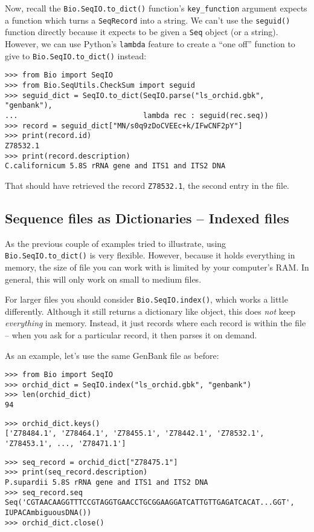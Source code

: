 Now, recall the \verb|Bio.SeqIO.to_dict()| function's \verb|key_function| argument expects a function which turns a \verb|SeqRecord| into a string.  We can't use the \verb|seguid()| function directly because it expects to be given a \verb|Seq| object (or a string).  However, we can use Python's \verb|lambda| feature to create a ``one off'' function to give to \verb|Bio.SeqIO.to_dict()| instead:

\begin{verbatim}
>>> from Bio import SeqIO
>>> from Bio.SeqUtils.CheckSum import seguid
>>> seguid_dict = SeqIO.to_dict(SeqIO.parse("ls_orchid.gbk", "genbank"),
...                             lambda rec : seguid(rec.seq))
>>> record = seguid_dict["MN/s0q9zDoCVEEc+k/IFwCNF2pY"]
>>> print(record.id)
Z78532.1
>>> print(record.description)
C.californicum 5.8S rRNA gene and ITS1 and ITS2 DNA
\end{verbatim}

\noindent That should have retrieved the record {\tt Z78532.1}, the second entry in the file.

\subsection{Sequence files as Dictionaries -- Indexed files}
\label{sec:SeqIO-index}

As the previous couple of examples tried to illustrate, using
\verb|Bio.SeqIO.to_dict()| is very flexible. However, because it holds
everything in memory, the size of file you can work with is limited by your
computer's RAM. In general, this will only work on small to medium files.

For larger files you should consider
\verb|Bio.SeqIO.index()|, which works a little differently. Although
it still returns a dictionary like object, this does \emph{not} keep
\emph{everything} in memory. Instead, it just records where each record
is within the file -- when you ask for a particular record, it then parses
it on demand.

As an example, let's use the same GenBank file as before:

\begin{verbatim}
>>> from Bio import SeqIO
>>> orchid_dict = SeqIO.index("ls_orchid.gbk", "genbank")
>>> len(orchid_dict)
94
\end{verbatim}
\begin{verbatim}
>>> orchid_dict.keys()
['Z78484.1', 'Z78464.1', 'Z78455.1', 'Z78442.1', 'Z78532.1', 'Z78453.1', ..., 'Z78471.1']
\end{verbatim}
\begin{verbatim}
>>> seq_record = orchid_dict["Z78475.1"]
>>> print(seq_record.description)
P.supardii 5.8S rRNA gene and ITS1 and ITS2 DNA
>>> seq_record.seq
Seq('CGTAACAAGGTTTCCGTAGGTGAACCTGCGGAAGGATCATTGTTGAGATCACAT...GGT', IUPACAmbiguousDNA())
>>> orchid_dict.close()
\end{verbatim}


